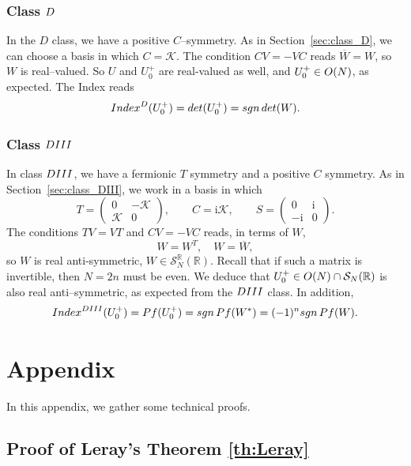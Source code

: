 \documentclass[11pt]{amsart}
\numberwithin{equation}{section} %
\newcommand\1{{\mathds 1}}
\def\R{{\mathbb R}}
\def\ri{{\mathrm{i}}}
\def\cK{{\mathcal K}}
\def\cS{{\mathcal S}}
\def\rD{{\rm D}}
\def\rDIII{{\rm DIII}}
\def\O{{\rm O}}
\def\Index{{\rm Index}}
\def\det{{\rm det}}
\def\Pf{{\rm Pf}}
\begin{document}
\subsubsection{Class $\rD$}
In the $D$ class, we have a positive $C$--symmetry. As in Section~\ref{sec:class_D}, we can choose a basis in which $C = \cK$. The condition $CV = - VC$ reads $\overline{W}= W$, so $W$ is real--valued. So $U$ and $U_0^+$ are real-valued as well, and $U_0^+ \in \O(N)$, as expected. The Index reads
\[
    \Index^D(U_0^+) = \det(U_0^+) = {\rm sgn} \, \det(W).
\]


\subsubsection{Class $\rDIII$} In class $\rDIII$, we have a fermionic $T$ symmetry and a positive $C$ symmetry. As in Section~\ref{sec:class_DIII}, we work in a basis in which
$$
T =  \begin{pmatrix}
    0 & -\cK\\
    \cK & 0
\end{pmatrix}, \qquad C= \ri\cK, \qquad S = \begin{pmatrix}
    0 & \ri \\
    -\ri & 0
\end{pmatrix}.
$$
The conditions $TV = VT$ and $CV = - VC$ reads, in terms of $W$,
\[
    W = W^T, \quad W = \overline{W},
\]
so $W$ is real anti-symmetric, $W \in \cS^\R_N(\R)$. Recall that if such a matrix is invertible, then $N = 2n$ must be even. We deduce that $U_0^+ \in \O(N) \cap \cS_N(\R)$ is also real anti--symmetric, as expected from the $\rDIII$ class. In addition, 
\[
    \Index^\rDIII(U_0^+) = \Pf(U_0^+) =  {\rm sgn} \, \Pf(W^*) = (-1)^n {\rm sgn} \, \Pf(W).
\]


\appendix

\section{Appendix}

In this appendix, we gather some technical proofs.

\subsection{Proof of Leray's Theorem \ref{th:Leray}}
\label{sec:proofLeray}
\end{document}
